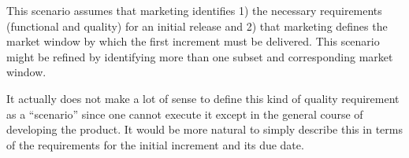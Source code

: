 \documentclass[11pt,letterpaper]{article}
\begin{document}
This scenario assumes that marketing identifies 1) the necessary requirements
(functional and quality) for an initial release and 2) that marketing defines
the market window by which the first increment must be delivered. This
scenario might be refined by identifying more than one subset and
corresponding market window.
 
It actually does not make a lot of sense to define this kind of quality
requirement as a “scenario” since one cannot execute it except in the general
course of developing the product. It would be more natural to simply describe
this in terms of the requirements for the initial increment and its due date.



\end{document}
